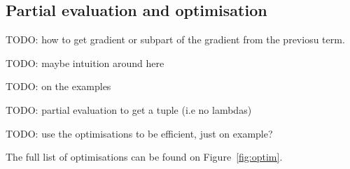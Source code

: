 

\subsection{Partial evaluation and optimisation} %
\label{sub:Partial evaluation and optimisation}

TODO: how to get gradient or subpart of the gradient from the previosu term.

TODO: maybe intuition around here

TODO: on the examples

TODO: partial evaluation to get a tuple (i.e no lambdas)

TODO: use the optimisations to be efficient, just on example?

The full list of optimisations can be found on Figure~\ref{fig:optim}.
